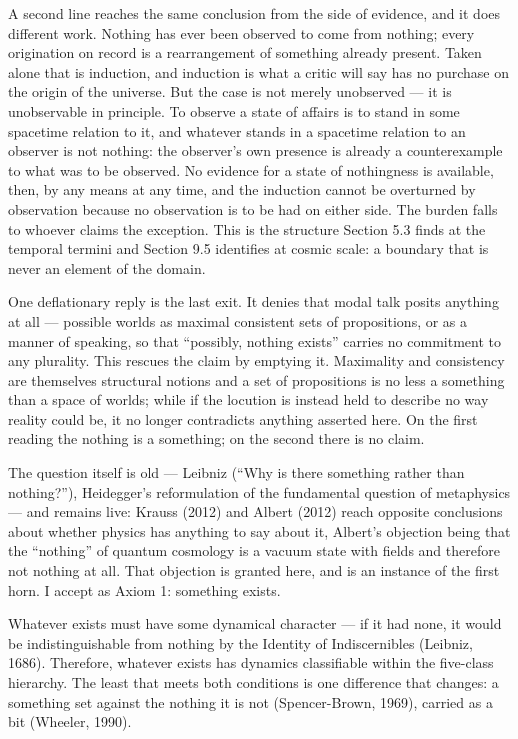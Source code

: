 \documentclass[
]{article}
\begin{document}
A second line reaches the same conclusion from the side of evidence, and
it does different work. Nothing has ever been observed to come from
nothing; every origination on record is a rearrangement of something
already present. Taken alone that is induction, and induction is what a
critic will say has no purchase on the origin of the universe. But the
case is not merely unobserved --- it is unobservable in principle. To
observe a state of affairs is to stand in some spacetime relation to it,
and whatever stands in a spacetime relation to an observer is not
nothing: the observer's own presence is already a counterexample to what
was to be observed. No evidence for a state of nothingness is available,
then, by any means at any time, and the induction cannot be overturned
by observation because no observation is to be had on either side. The
burden falls to whoever claims the exception. This is the structure
Section 5.3 finds at the temporal termini and Section 9.5 identifies at
cosmic scale: a boundary that is never an element of the domain.

One deflationary reply is the last exit. It denies that modal talk
posits anything at all --- possible worlds as maximal consistent sets of
propositions, or as a manner of speaking, so that ``possibly, nothing
exists'' carries no commitment to any plurality. This rescues the claim
by emptying it. Maximality and consistency are themselves structural
notions and a set of propositions is no less a something than a space of
worlds; while if the locution is instead held to describe no way reality
could be, it no longer contradicts anything asserted here. On the first
reading the nothing is a something; on the second there is no claim.

The question itself is old --- Leibniz (``Why is there something rather
than nothing?''), Heidegger's reformulation of the fundamental question
of metaphysics --- and remains live: Krauss (2012) and Albert (2012)
reach opposite conclusions about whether physics has anything to say
about it, Albert's objection being that the ``nothing'' of quantum
cosmology is a vacuum state with fields and therefore not nothing at
all. That objection is granted here, and is an instance of the first
horn. I accept as Axiom 1: something exists.

Whatever exists must have some dynamical character --- if it had none,
it would be indistinguishable from nothing by the Identity of
Indiscernibles (Leibniz, 1686). Therefore, whatever exists has dynamics
classifiable within the five-class hierarchy. The least that meets both
conditions is one difference that changes: a something set against the
nothing it is not (Spencer-Brown, 1969), carried as a bit (Wheeler,
1990).
\end{document}

